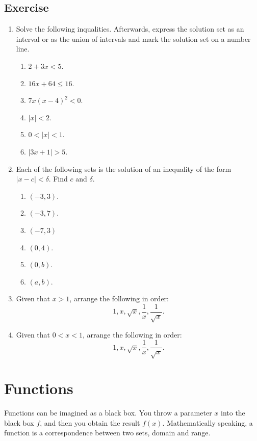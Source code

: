\documentclass[11pt]{book}
\theoremstyle{break}
\theoremstyle{no_label}
\numberwithin{equation}{section}
\begin{document}
\subsection*{Exercise}
\begin{enumerate}[label=\arabic*.]
    \item Solve the following inqualities. Afterwards, express the solution set as an interval or as the union of intervals and mark the solution set on a number line.
    \begin{multicols}{3}
        \begin{enumerate}
            \item $2+3x<5$.
            \item $16x+64\leq16$.
            \item $7x(x-4)^2<0$.
            \item $|x|<2$.
            \item $0<|x|<1$.
            \item $|3x+1|>5$.
        \end{enumerate}
    \end{multicols}
    \item Each of the following sets is the solution of an inequality of the form $|x-c|<\delta$. Find $c$ and $\delta$.
    \begin{multicols}{3}
        \begin{enumerate}
            \item $(-3, 3)$.
            \item $(-3, 7)$.
            \item $(-7, 3)$
            \item $(0, 4)$.
            \item $(0, b)$.
            \item $(a, b)$.
        \end{enumerate}
    \end{multicols}
    \item Given that $x>1$, arrange the following in order: $$1, x, \sqrt{x}, \dfrac{1}{x}, \dfrac{1}{\sqrt{x}}.$$
    \item Given that $0<x<1$, arrange the following in order: $$1, x, \sqrt{x}, \dfrac{1}{x}, \dfrac{1}{\sqrt{x}}.$$
\end{enumerate}

\section{Functions}

Functions can be imagined as a black box. You throw a parameter $x$ into the black box $f$, and then you obtain the result $f(x)$. Mathematically speaking, a function is a correspondence between two sets, domain and range.
\end{document}
